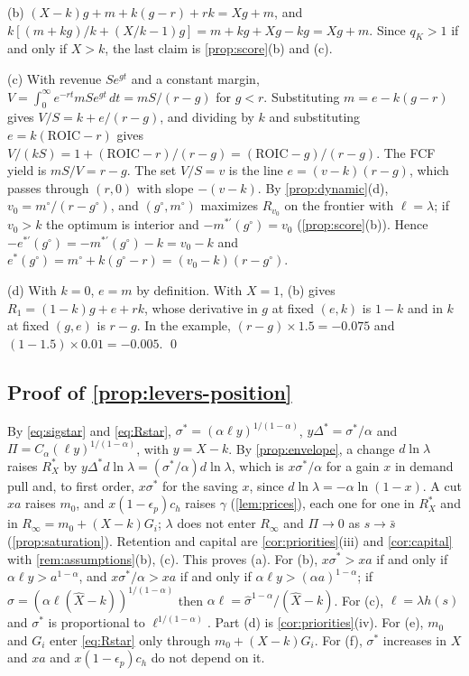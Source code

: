 (b) $(X-k)g+m+k(g-r)+rk=Xg+m$, and $k[(m+kg)/k+(X/k-1)g]=m+kg+Xg-kg=Xg+m$. Since $q_K>1$ if and only if $X>k$, the last claim is \autoref{prop:score}(b) and (c).

(c) With revenue $Se^{gt}$ and a constant margin, $V=\int_0^\infty e^{-rt}mSe^{gt}\,dt=mS/(r-g)$ for $g<r$. Substituting $m=e-k(g-r)$ gives $V/S=k+e/(r-g)$, and dividing by $k$ and substituting $e=k(\mathrm{ROIC}-r)$ gives $V/(kS)=1+(\mathrm{ROIC}-r)/(r-g)=(\mathrm{ROIC}-g)/(r-g)$. The FCF yield is $mS/V=r-g$. The set $V/S=v$ is the line $e=(v-k)(r-g)$, which passes through $(r,0)$ with slope $-(v-k)$. By \autoref{prop:dynamic}(d), $v_0=m^\circ/(r-g^\circ)$, and $(g^\circ,m^\circ)$ maximizes $R_{v_0}$ on the frontier with $\ell=\lambda$; if $v_0>k$ the optimum is interior and $-m^{*\prime}(g^\circ)=v_0$ (\autoref{prop:score}(b)). Hence $-e^{*\prime}(g^\circ)=-m^{*\prime}(g^\circ)-k=v_0-k$ and $e^*(g^\circ)=m^\circ+k(g^\circ-r)=(v_0-k)(r-g^\circ)$.

(d) With $k=0$, $e=m$ by definition. With $X=1$, (b) gives $R_1=(1-k)g+e+rk$, whose derivative in $g$ at fixed $(e,k)$ is $1-k$ and in $k$ at fixed $(g,e)$ is $r-g$. In the example, $(r-g)\times1.5=-0.075$ and $(1-1.5)\times0.01=-0.005$. \qed

\subsection*{Proof of \autoref{prop:levers-position}}
By \eqref{eq:sigstar} and \eqref{eq:Rstar}, $\sigma^*=(\alpha\ell y)^{1/(1-\alpha)}$, $y\Delta^*=\sigma^*/\alpha$ and $\Pi=C_\alpha(\ell y)^{1/(1-\alpha)}$, with $y=X-k$. By \autoref{prop:envelope}, a change $d\ln\lambda$ raises $R^*_X$ by $y\Delta^*d\ln\lambda=(\sigma^*/\alpha)d\ln\lambda$, which is $x\sigma^*/\alpha$ for a gain $x$ in demand pull and, to first order, $x\sigma^*$ for the saving $x$, since $d\ln\lambda=-\alpha\ln(1-x)$. A cut $xa$ raises $m_0$, and $x(1-\epsilon_p)c_h$ raises $\gamma$ (\autoref{lem:prices}), each one for one in $R^*_X$ and in $R_\infty=m_0+(X-k)G_i$; $\lambda$ does not enter $R_\infty$ and $\Pi\to0$ as $s\to\bar s$ (\autoref{prop:saturation}). Retention and capital are \autoref{cor:priorities}(iii) and \autoref{cor:capital} with \autoref{rem:assumptions}(b), (c). This proves (a). For (b), $x\sigma^*>xa$ if and only if $\alpha\ell y>a^{1-\alpha}$, and $x\sigma^*/\alpha>xa$ if and only if $\alpha\ell y>(\alpha a)^{1-\alpha}$; if $\hat\sigma=(\alpha\ell(\hat X-k))^{1/(1-\alpha)}$ then $\alpha\ell=\hat\sigma^{1-\alpha}/(\hat X-k)$. For (c), $\ell=\lambda h(s)$ and $\sigma^*$ is proportional to $\ell^{1/(1-\alpha)}$. Part (d) is \autoref{cor:priorities}(iv). For (e), $m_0$ and $G_i$ enter \eqref{eq:Rstar} only through $m_0+(X-k)G_i$. For (f), $\sigma^*$ increases in $X$ and $xa$ and $x(1-\epsilon_p)c_h$ do not depend on it.

